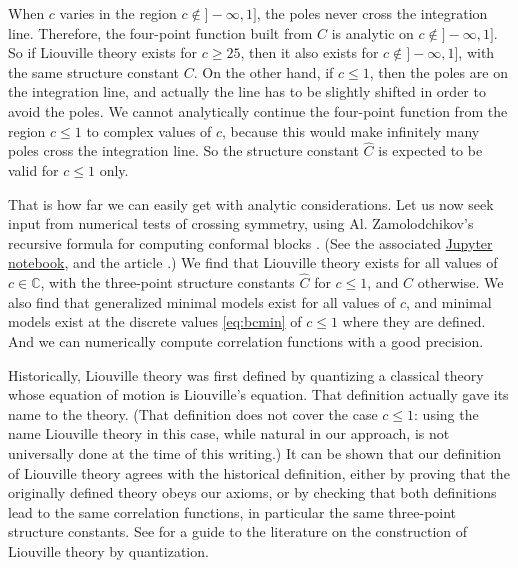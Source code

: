 \documentclass[12pt, a4paper]{article}
\theoremstyle{break}
\begin{document}
When $c$ varies in the region $c\notin ]-\infty,1]$, the poles never cross the integration line.
Therefore, 
the four-point function built from $C$ is analytic on $c\notin ]-\infty,1]$. 
So if Liouville theory exists for $c\geq 25$, then it also exists for $c\notin ]-\infty,1]$, with the same structure constant $C$. 
On the other hand, if $c\leq 1$, then the poles are on the integration line, and actually the line
has to be slightly shifted in order to avoid the poles. 
We cannot analytically continue the four-point function from the region $c\leq 1$ to complex values of $c$, because this would make infinitely many poles cross the integration line.
So the structure constant $\hat C$ is expected to be valid for $c\leq 1$ only.

That is how far we can easily get with analytic considerations. 
Let us now seek input from numerical tests of crossing symmetry, using Al. Zamolodchikov's recursive formula for computing conformal blocks \cite{zz90}. (See the associated \href{https://github.com/ribault/bootstrap-2d-Python/blob/master/Liouville_demo_2.ipynb}{Jupyter notebook}, and the article \cite{rs15}.)
We find that Liouville theory exists for all values of $c\in\mathbb{C}$, with the three-point structure constants $\hat C$ for $c\leq 1$, and $C$ otherwise.
We also find that generalized minimal models exist for all values of $c$, and minimal models exist at the discrete values \eqref{eq:bcmin} of $c\leq 1$ where they are defined. 
And we can numerically compute correlation functions with a good precision.

Historically, Liouville theory was first defined by quantizing a classical theory whose equation of motion is Liouville's equation. That definition actually gave its name to the theory. (That definition does not cover the case $c\leq 1$: using the name Liouville theory in this case, while natural in our approach, is not universally done at the time of this writing.) It can be shown that our definition of Liouville theory agrees with the historical definition, either by proving that the originally defined theory obeys our axioms, or by checking that both definitions lead to the same correlation functions, in particular the same three-point structure constants. See \cite{tes17} for a guide to the literature on the construction of Liouville theory by quantization. 

\appendix

\hypersetup{linkcolor=black}

\renewcommand{\listtheoremname}{List of Exercises}
\listoftheorems[ignoreall, show={exo}]
\end{document}
